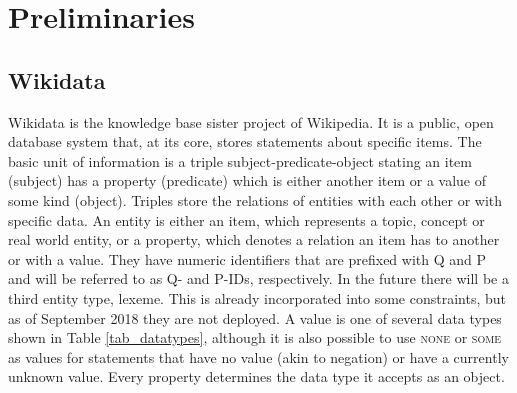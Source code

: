 \documentclass[hyperref,bachelorofscience,fleqn]{cgvpub}
\begin{document}
\chapter{Preliminaries}\label{cha_preliminaries}
\section{Wikidata}\label{sec_wikidata}
Wikidata is the knowledge base sister project of Wikipedia. It is a public, open database system that, at its core, stores statements about specific items. The basic unit of information is a triple subject-predicate-object stating an item (subject) has a property (predicate) which is either another item or a value of some kind (object). Triples store the relations of entities with each other or with specific data. An entity is either an item, which represents a topic, concept or real world entity, or a property, which denotes a relation an item has to another or with a value. They have numeric identifiers that are prefixed with Q and P and will be referred to as Q- and P-IDs, respectively. In the future there will be a third entity type, lexeme. This is already incorporated into some constraints, but as of September 2018 they are not deployed. A value is one of several data types shown in Table \ref{tab_datatypes}, although it is also possible to use \textsc{none} or \textsc{some} as values for statements that have no value (akin to negation) or have a currently unknown value. Every property determines the data type it accepts as an object. \\
\end{document}
